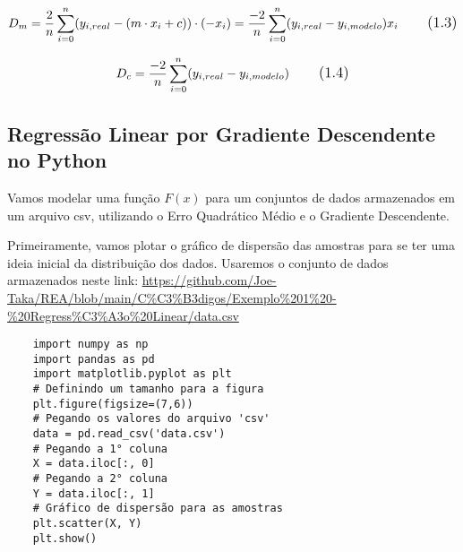 \begin{equation}
\large D_{m} = \frac{2}{n}\sum_{i=0}^{n}(y_{i,real} - (m \cdot x_{i} + c))\cdot(-x_{i}) = \frac{-2}{n}\sum_{i=0}^{n}(y_{i,real} - y_{i,modelo})x_{i}
\tag{1.3}
\end{equation}

\begin{equation}
\large D_{c} = \frac{-2}{n}\sum_{i=0}^{n}(y_{i,real} - y_{i,modelo})
\tag{1.4}
\end{equation}



\subsection{Regressão Linear por Gradiente Descendente no Python}
Vamos modelar uma função $F(x)$ para um conjuntos de dados armazenados em um arquivo csv, utilizando o Erro Quadrático Médio e o Gradiente Descendente.

Primeiramente, vamos plotar o gráfico de dispersão das amostras para se ter uma ideia inicial da distribuição dos dados. Usaremos o conjunto de dados armazenados neste link:
\url {https://github.com/Joe-Taka/REA/blob/main/C%C3%B3digos/Exemplo%201%20-%20Regress%C3%A3o%20Linear/data.csv}

\begin{verbatim}
	import numpy as np
	import pandas as pd
	import matplotlib.pyplot as plt
	# Definindo um tamanho para a figura
	plt.figure(figsize=(7,6))
	# Pegando os valores do arquivo 'csv'
	data = pd.read_csv('data.csv')
	# Pegando a 1° coluna
	X = data.iloc[:, 0]
	# Pegando a 2° coluna
	Y = data.iloc[:, 1]
	# Gráfico de dispersão para as amostras
	plt.scatter(X, Y)
	plt.show()
\end{verbatim}

